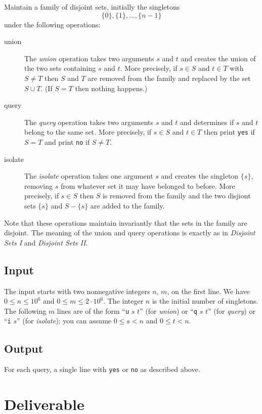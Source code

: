 \documentclass{tufte-handout}
\begin{document}
Maintain a family of disjoint sets, initially the singletons
\[ \{0\},\{1\}, \ldots,\{n-1\} \]
under the following operations:
\begin{description}
  \item[union]
The \emph{union} operation takes two arguments $s$ and $t$ and creates the union of the two sets containing $s$ and $t$.
More precisely, if $s\in S$ and $t\in T$ with $S\neq T$ then $S$ and $T$ are removed from the family and replaced by the set $S\cup T$. 
    (If $S=T$  then nothing happens.)
  \item[query]
    The \emph{query} operation takes two arguments $s$ and $t$ and determines if $s$ and $t$ belong to the same set.
    More precisely, if $s\in S$ and $t\in T$ then print \texttt{yes} if $S=T$ and print \texttt{no} if $S\neq T$.
  \item[isolate]
    The \emph{isolate} operation takes one argument $s$ and creates the singleton $\{s\}$, removing $s$ from whatever set it may have belonged to before.
    More precisely, if $s\in S$ then $S$ is removed from the family and the two disjiont sets $\{s\}$ and $S-\{s\}$ are added to the family.
\end{description}
Note that these operations maintain invariantly that the sets in the family are disjoint.
The meaning of the union and query operations is exactly as in \emph{Disjoint Sets I} and \emph{Disjoint Sets II}.

\subsection{Input}

The input starts with two nonnegative integers $n$, $m$, on the first line.
We have $0\leq n\leq 10^6$ and $0\leq m\leq 2\cdot 10^6$.
The integer $n$ is the initial number of singletons.
The following $m$ lines are of the form ``\texttt{u} $s$ $t$'' (for \emph{union}) or ``\texttt{q} $s$ $t$'' (for \emph{query}) or ``\texttt{i} $s$'' (for \emph{isolate}); you can assume $0\leq s< n$ and $0\leq t< n$.

\subsection{Output}


For each query, a single line with \texttt{yes} or \texttt{no} as described above.


\section{Deliverable}
\end{document}
